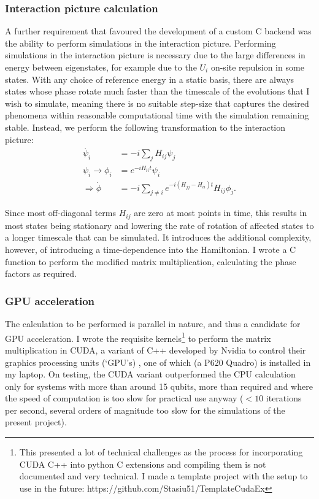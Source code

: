 \documentclass{report}
\begin{document}
\begin{appendices}
\subsubsection{Interaction picture calculation}
A further requirement that favoured the development of a custom C backend was the ability to perform simulations in the interaction picture. Performing simulations in the interaction picture is necessary due to the large differences in energy between eigenstates, for example due to the $U_i$ on-site repulsion in some states. With any choice of reference energy in a static basis, there are always states whose phase rotate much faster than the timescale of the evolutions that I wish to simulate, meaning there is no suitable step-size that captures the desired phenomena within reasonable computational time with the simulation remaining stable. Instead, we perform the following transformation to the interaction picture:
\begin{align*}
    \dot{\psi_i} &= -i\sum_j{H_{ij}\psi_j}\\
     \psi_i \rightarrow \phi_i &= e^{-i H_{ii} t} \psi_i \\
    \Rightarrow \dot{\phi} &= -i\sum_{j\ne i}{e^{- i (H_{jj} - H_{ii})t} H_{ij}\phi_j}.
\end{align*}

Since most off-diagonal terms $H_{ij}$ are zero at most points in time, this results in most states being stationary and lowering the rate of rotation of affected states to a longer timescale that can be simulated. It introduces the additional complexity, however, of introducing a time-dependence into the Hamiltonian. I wrote a C function to perform the modified matrix multiplication, calculating the phase factors as required.

\subsubsection{GPU acceleration}
The calculation to be performed is parallel in nature, and thus a candidate for GPU acceleration. I wrote the requisite kernels\footnote{This presented a lot of technical challenges as the process for incorporating CUDA C++ into python C extensions and compiling them is not documented and very technical. I made a template project with the setup to use in the future: https://github.com/Stasiu51/TemplateCudaEx} to perform the matrix multiplication in CUDA, a variant of C++ developed by Nvidia to control their graphics processing units (`GPU's) \cite{cuda}, one of which (a P620 Quadro) is installed in my laptop. On testing, the CUDA variant outperformed the CPU calculation only for systems with more than around 15 qubits, more than required and where the speed of computation is too slow for practical use anyway ($<10$ iterations per second, several orders of magnitude too slow for the simulations of the present project).


\end{appendices}
\end{document}

